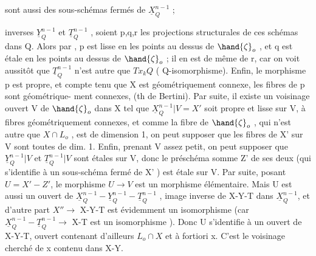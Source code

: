  sont aussi des sous-schémas fermés  de $\underline{X}^{n-1}_Q$ ;

inverses $\underline{Y}^{n-1}_Q$ et $\underline{T}^{n-1}_Q$ , soient p,q,r les projections structurales
de ces schémas dans Q. Alors par , p est lisse en les
points au dessus de $\hand{\zeta}_o$ , et q est étale en les points au dessus de $\hand{\zeta}_o$ ;
il en est de même de r, car on voit aussitôt que $\underline{T}^{n-1}_Q$ n'est autre que
$Tx_kQ$ ( Q-isomorphisme). Enfin, le morphisme p est propre, et compte
tenu que X est géométriquement connexe, les fibres de p sont géométrique-%
ment connexes, (th de Bertini). Par suite, il existe un voisinage ouvert
V de $\hand{\zeta}_o$ dans X tel que  $\underline{X}^{n-1}_Q|V = X'$ soit propre et lisse
sur V, à fibres géométriquement connexes, et comme la fibre de $\hand{\zeta}_o$ ,
qui n'est autre que $X\cap L_o$ , est de dimension 1, on peut supposer que les
fibres de X' sur V sont toutes de dim. 1. Enfin, prenant V assez petit,
on peut supposer que $\underline{Y}^{n-1}_Q|V$ et $\underline{T}^{n-1}_Q|V$ sont étales sur V, donc le
préschéma somme Z' de ses deux (qui s'identifie à un sous-schéma
fermé de X' ) est étale sur V. Par suite,  posant $U = X' - Z'$,
 le morphisme $U\to V$ est un morphisme élémentaire. Mais  U est aussi
un ouvert de $\underline{X}^{n-1}_Q - \underline{Y}^{n-1}_Q - \underline{T}^{n-1}_Q$ , image inverse de X-Y-T dans $\underline{X}^{n-1}_Q$,
et d'autre part $X''\to$ X-Y-T est évidemment un isomorphisme (car
$\underline{X}^{n-1}_Q - \underline{T}^{n-1}_Q \to$ X-T est un isomorphisme ). Donc U s'identifie à un ouvert
de X-Y-T, ouvert contenant d'ailleurs $L_o\cap X$ et à fortiori x. C'est le
voisinage cherché de x contenu dans X-Y.

